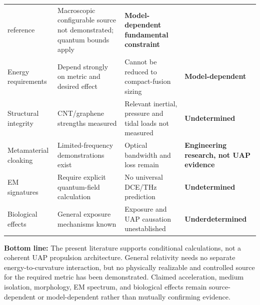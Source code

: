 \documentclass[aps,prd,twocolumn,superscriptaddress,nofootinbib,floatfix]{revtex4-2}
\begin{document}
\begin{table}[t]
\begin{tabular}{@{}llll@{}}
{  reference\strut} & \parbox[t]{0.29\textwidth}{\strut Macroscopic configurable source not demonstrated; quantum bounds
  apply\strut} & \parbox[t]{0.19\textwidth}{\strut \textbf{Model-dependent fundamental constraint}\strut} \\
\parbox[t]{0.17\textwidth}{\strut Energy requirements\strut} & \parbox[t]{0.27\textwidth}{\strut Depend strongly on metric and desired effect\strut} & \parbox[t]{0.29\textwidth}{\strut Cannot be
  reduced to compact-fusion sizing\strut} & \parbox[t]{0.19\textwidth}{\strut \textbf{Model-dependent}\strut} \\
\parbox[t]{0.17\textwidth}{\strut Structural integrity\strut} & \parbox[t]{0.27\textwidth}{\strut CNT/graphene strengths measured\strut} & \parbox[t]{0.29\textwidth}{\strut Relevant inertial,
  pressure and tidal loads not measured\strut} & \parbox[t]{0.19\textwidth}{\strut \textbf{Undetermined}\strut} \\
\parbox[t]{0.17\textwidth}{\strut Metamaterial cloaking\strut} & \parbox[t]{0.27\textwidth}{\strut Limited-frequency demonstrations exist\strut} & \parbox[t]{0.29\textwidth}{\strut Optical
  bandwidth and loss remain\strut} & \parbox[t]{0.19\textwidth}{\strut \textbf{Engineering research, not UAP evidence}\strut} \\
\parbox[t]{0.17\textwidth}{\strut EM signatures\strut} & \parbox[t]{0.27\textwidth}{\strut Require explicit quantum-field calculation\strut} & \parbox[t]{0.29\textwidth}{\strut No universal
  DCE/THz prediction\strut} & \parbox[t]{0.19\textwidth}{\strut \textbf{Undetermined}\strut} \\
\parbox[t]{0.17\textwidth}{\strut Biological effects\strut} & \parbox[t]{0.27\textwidth}{\strut General exposure mechanisms known\strut} & \parbox[t]{0.29\textwidth}{\strut Exposure and UAP
  causation unestablished\strut} & \parbox[t]{0.19\textwidth}{\strut \textbf{Underdetermined}\strut} \\
\bottomrule
\end{tabular}
\end{table}

\textbf{Bottom line:} The present literature supports conditional calculations,
not a coherent UAP propulsion architecture. General relativity needs no separate
energy-to-curvature interaction, but no physically realizable and controlled
source for the required metric has been demonstrated. Claimed acceleration, medium
isolation, morphology, EM spectrum, and biological effects remain source-dependent
or model-dependent rather than mutually confirming evidence.
\end{document}
